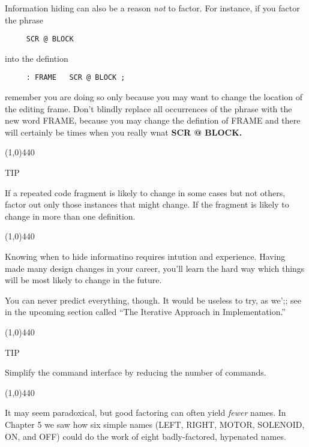 \documentclass{book}
\begin{document}
Information hiding can also be a reason \textit{not} to factor. For instance, if you factor the phrase

\begin{verbatim}
     SCR @ BLOCK
\end{verbatim}

\noindent
into the defintion

\begin{verbatim}
     : FRAME   SCR @ BLOCK ;
\end{verbatim}

\noindent
remember you are doing so only because you may want to change the location of the editing frame. Don't blindly replace all occurrences of the phrase with the new word FRAME, because you may change the defintion of FRAME and there will certainly be times when you really wnat \textbf{SCR @ BLOCK.}

\bigskip

\line(1,0){440}

\begin{list}{}{}

\item
TIP

\item
If a repeated code fragment is likely to change in some cases but not others, factor out only those instances that might change. If the fragment is likely to change in more than one definition.

\end{list}{}{}

\line(1,0){440}

\bigskip 

\noindent
Knowing when to hide informatino requires intution and experience. Having made many design changes in your career, you'll learn the hard way which things will be most likely to change in the future.

You can never predict everything, though. It would be useless to try, as we';; see in the upcoming section called ``The Iterative Approach in Implementation.''

\line(1,0){440}

TIP

Simplify the command interface by reducing the number of commands.

\line(1,0){440}

\bigskip

\noindent
It may seem paradoxical, but good factoring can often yield \textit{fewer} names. In Chapter 5 we saw how six simple names (LEFT, RIGHT, MOTOR, SOLENOID, ON, and OFF) could do the work of eight badly-factored, hypenated names.
\end{document}
